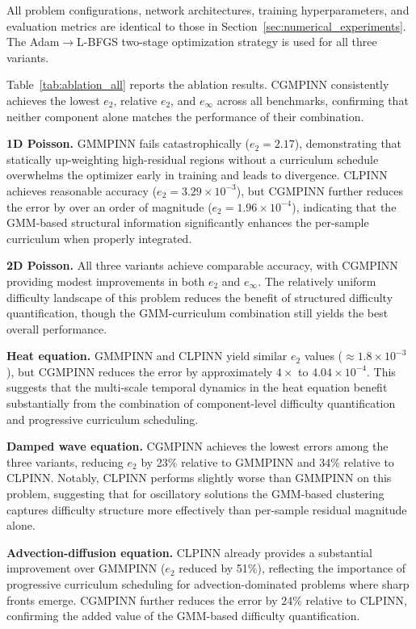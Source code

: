 \documentclass{article}
\theoremstyle{plain}
\theoremstyle{definition}
\theoremstyle{remark}
\begin{document}
\noindent All problem configurations, network architectures, training hyperparameters, and evaluation metrics are identical to those in Section~\ref{sec:numerical_experiments}. The Adam$\to$L-BFGS two-stage optimization strategy is used for all three variants.

Table~\ref{tab:ablation_all} reports the ablation results. CGMPINN consistently achieves the lowest $e_2$, relative $e_2$, and $e_\infty$ across all benchmarks, confirming that neither component alone matches the performance of their combination.

\textbf{1D Poisson.}\;
GMMPINN fails catastrophically ($e_2=2.17$), demonstrating that statically up-weighting high-residual regions without a curriculum schedule overwhelms the optimizer early in training and leads to divergence. CLPINN achieves reasonable accuracy ($e_2=3.29\times10^{-3}$), but CGMPINN further reduces the error by over an order of magnitude ($e_2=1.96\times10^{-4}$), indicating that the GMM-based structural information significantly enhances the per-sample curriculum when properly integrated.

\textbf{2D Poisson.}\;
All three variants achieve comparable accuracy, with CGMPINN providing modest improvements in both $e_2$ and $e_\infty$. The relatively uniform difficulty landscape of this problem reduces the benefit of structured difficulty quantification, though the GMM-curriculum combination still yields the best overall performance.

\textbf{Heat equation.}\;
GMMPINN and CLPINN yield similar $e_2$ values ($\approx1.8\times10^{-3}$), but CGMPINN reduces the error by approximately $4\times$ to $4.04\times10^{-4}$. This suggests that the multi-scale temporal dynamics in the heat equation benefit substantially from the combination of component-level difficulty quantification and progressive curriculum scheduling.

\textbf{Damped wave equation.}\;
CGMPINN achieves the lowest errors among the three variants, reducing $e_2$ by 23\% relative to GMMPINN and 34\% relative to CLPINN. Notably, CLPINN performs slightly worse than GMMPINN on this problem, suggesting that for oscillatory solutions the GMM-based clustering captures difficulty structure more effectively than per-sample residual magnitude alone.

\textbf{Advection-diffusion equation.}\;
CLPINN already provides a substantial improvement over GMMPINN ($e_2$ reduced by 51\%), reflecting the importance of progressive curriculum scheduling for advection-dominated problems where sharp fronts emerge. CGMPINN further reduces the error by 24\% relative to CLPINN, confirming the added value of the GMM-based difficulty quantification.
\end{document}
